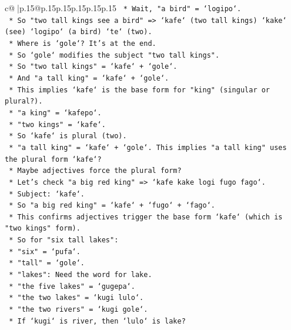 \documentclass{article}
\begin{document}
{\begin{supertabular}{c@{$\;$}|p{.15\linewidth}@{}p{.15\linewidth}p{.15\linewidth}p{.15\linewidth}p{.15\linewidth}p{.15\linewidth}}
{{{\texttt{            *   Wait, "a bird" = `logipo`.} \\
\texttt{            *   So "two tall kings see a bird" => `kafe` (two tall kings) `kake` (see) `logipo` (a bird) `te` (two).} \\
\texttt{            *   Where is `gole`? It's at the end.} \\
\texttt{            *   So `gole` modifies the subject "two tall kings".} \\
\texttt{            *   So "two tall kings" = `kafe` + `gole`.} \\
\texttt{            *   And "a tall king" = `kafe` + `gole`.} \\
\texttt{            *   This implies `kafe` is the base form for "king" (singular or plural?).} \\
\texttt{            *   "a king" = `kafepo`.} \\
\texttt{            *   "two kings" = `kafe`.} \\
\texttt{            *   So `kafe` is plural (two).} \\
\texttt{            *   "a tall king" = `kafe` + `gole`. This implies "a tall king" uses the plural form `kafe`?} \\
\texttt{            *   Maybe adjectives force the plural form?} \\
\texttt{            *   Let's check "a big red king" => `kafe kake logi fugo fago`.} \\
\texttt{            *   Subject: `kafe`.} \\
\texttt{            *   So "a big red king" = `kafe` + `fugo` + `fago`.} \\
\texttt{            *   This confirms adjectives trigger the base form `kafe` (which is "two kings" form).} \\
\texttt{            *   So for "six tall lakes":} \\
\texttt{                *   "six" = `pufa`.} \\
\texttt{                *   "tall" = `gole`.} \\
\texttt{                *   "lakes": Need the word for lake.} \\
\texttt{                *   "the five lakes" = `gugepa`.} \\
\texttt{                *   "the two lakes" = `kugi lulo`.} \\
\texttt{                *   "the two rivers" = `kugi gole`.} \\
\texttt{                *   If `kugi` is river, then `lulo` is lake?} \\
}}}
\end{supertabular}}
\end{document}
